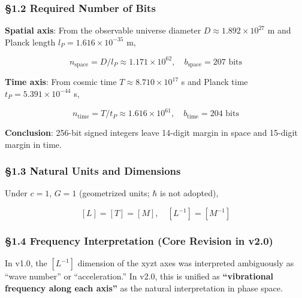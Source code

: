 \documentclass[a4paper,11pt]{article}
\begin{document}
\subsubsection{§1.2 Required Number of
Bits}\label{required-number-of-bits}

\textbf{Spatial axis}: From the observable universe diameter
\(D \approx 1.892 \times 10^{27}\) m and Planck length
\(l_P = 1.616 \times 10^{-35}\) m,

\[n_{\text{space}} = D / l_P \approx 1.171 \times 10^{62}, \quad b_{\text{space}} = 207 \text{ bits}\]

\textbf{Time axis}: From cosmic time \(T \approx 8.710 \times 10^{17}\)
s and Planck time \(t_P = 5.391 \times 10^{-44}\) s,

\[n_{\text{time}} = T / t_P \approx 1.616 \times 10^{61}, \quad b_{\text{time}} = 204 \text{ bits}\]

\textbf{Conclusion}: 256-bit signed integers leave 14-digit margin in
space and 15-digit margin in time.

\subsubsection{§1.3 Natural Units and
Dimensions}\label{natural-units-and-dimensions}

Under \(c = 1\), \(G = 1\) (geometrized units; \(\hbar\) is not
adopted),

\[[L] = [T] = [M], \quad [L^{-1}] = [M^{-1}]\]

\subsubsection{§1.4 Frequency Interpretation (Core Revision in
v2.0)}\label{frequency-interpretation-core-revision-in-v2.0}

In v1.0, the \([L^{-1}]\) dimension of the xyzt axes was interpreted
ambiguously as ``wave number'' or ``acceleration.'' In v2.0, this is
unified as \textbf{``vibrational frequency along each axis''} as the
natural interpretation in phase space.
\end{document}
